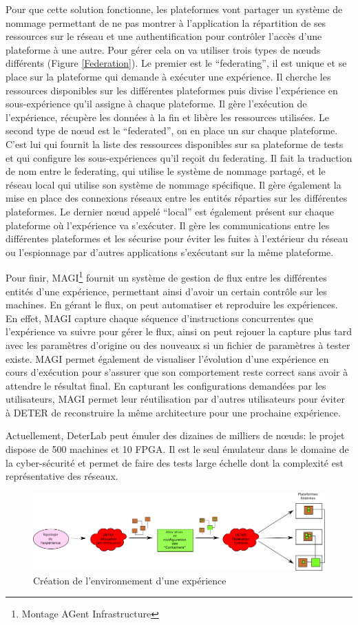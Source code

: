Pour que cette solution fonctionne, les plateformes vont partager un système de
nommage permettant de ne pas montrer à l'application la répartition de ses
ressources sur le réseau et une authentification pour contrôler l'accès d'une
plateforme à une autre. Pour gérer cela on va utiliser trois types de n\oe uds
différents (Figure \ref{Federation}). Le premier est le ``federating'', il est
unique et se place sur la plateforme qui demande à exécuter une expérience. Il
cherche les ressources disponibles sur les différentes plateformes puis divise
l'expérience en sous-expérience qu'il assigne à chaque plateforme. Il gère
l'exécution de l'expérience, récupère les données à la fin et
libère les ressources utilisées. Le second type de n\oe ud est le ``federated'',
on en place un sur chaque plateforme. C'est lui qui fournit la liste des
ressources disponibles sur sa plateforme de tests et qui configure les
sous-expériences qu'il reçoit du federating. Il fait la traduction de nom entre
le federating, qui utilise le système de nommage partagé, et le réseau local qui
utilise son système de nommage spécifique.  Il gère également la mise en place
des connexions réseaux entre les entités réparties sur les différentes
plateformes. Le dernier n\oe ud appelé ``local'' est également présent sur
chaque plateforme où l'expérience va s'exécuter. Il gère les communications
entre les différentes plateformes et les sécurise pour éviter les fuites à
l'extérieur du réseau ou l'espionnage par d'autres applications s'exécutant sur
la même plateforme.

Pour finir, MAGI\footnote{Montage AGent Infrastructure} fournit un système de
gestion de flux entre les différentes entités d'une expérience, permettant ainsi
d'avoir un certain contrôle sur les machines. En gérant le flux, on peut
automatiser et reproduire les expériences. En effet, MAGI capture chaque
séquence d'instructions concurrentes que l'expérience va suivre pour gérer le
flux, ainsi on peut rejouer la capture plus tard avec les paramètres d'origine
ou des nouveaux si un fichier de paramètres à tester existe. MAGI permet
également de visualiser l'évolution d'une expérience en cours d'exécution pour
s'assurer que son comportement reste correct sans avoir à attendre le résultat
final. En capturant les configurations demandées par les utilisateurs, MAGI
permet leur réutilisation par d'autres utilisateurs pour éviter à DETER de
reconstruire la même architecture pour une prochaine expérience.

Actuellement, DeterLab peut émuler des dizaines de milliers de n\oe uds: le
projet dispose de 500 machines et 10 FPGA. Il est le seul émulateur dans le
domaine de la cyber-sécurité et permet de faire des tests large échelle dont la
complexité est représentative des réseaux.
 
\begin{figure}[H]
\centering
\includegraphics[scale=0.63]{Pictures/png/Deter_fonctionnement_general}
\caption{Création de l'environnement d'une expérience}
\label{Deter_fonc}
\end{figure}
